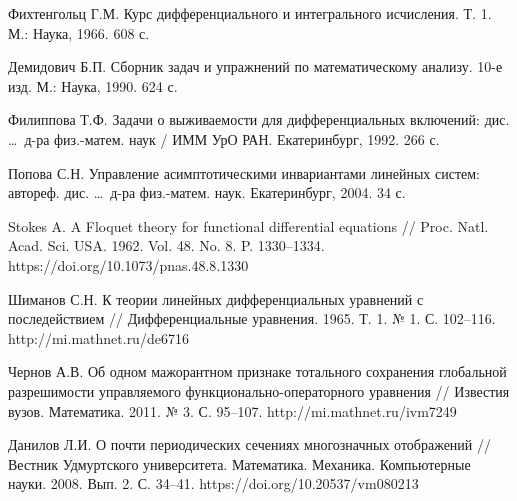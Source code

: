 \documentclass[12pt,a4paper,twoside]{article}  %
\begin{document}
{\begin{thebibliography}{99}

 Фихтенгольц Г.М. Курс дифференциального и интегрального исчисления. Т. 1. М.: Наука, 1966. 608 с.

 Демидович Б.П. Сборник задач и упражнений по математическому анализу. 10-е изд. М.: Наука, 1990. 624 с.


 Филиппова Т.Ф. Задачи о выживаемости для дифференциальных включений: дис. \ldots\ д-ра физ.-матем. наук / ИММ УрО РАН. Екатеринбург, 1992. 266 с.


 Попова С.Н. Управление асимптотическими инвариантами линейных систем: автореф. дис. \ldots\ д-ра физ.-матем. наук. Екатеринбург, 2004. 34 с.


 Stokes A. A Floquet theory for functional differential equations // Proc. Natl. Acad. Sci. USA. 1962. Vol. 48. No. 8. P. 1330--1334.
https://doi.org/10.1073/pnas.48.8.1330

 Шиманов С.Н. К теории линейных дифференциальных уравнений с последействием // Дифференциальные уравнения. 1965. Т. 1. № 1. С. 102--116.
http://mi.mathnet.ru/de6716

 Чернов А.В. Об одном мажорантном признаке тотального сохранения глобальной разрешимости управляемого функционально-операторного уравнения // Известия вузов. Математика. 2011. № 3. С. 95--107.
    http://mi.mathnet.ru/ivm7249


 Данилов Л.И. О почти периодических сечениях многозначных отображений // Вестник Удмуртского университета. Математика. Механика. Компьютерные науки. 2008. Вып. 2. С. 34--41.
https://doi.org/10.20537/vm080213


\end{thebibliography}}
\end{document}
